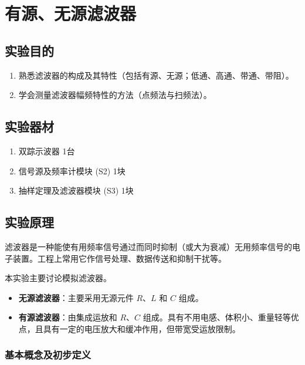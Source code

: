 \documentclass[12pt, a4paper]{ctexrep}
\begin{document}
\chapter{有源、无源滤波器}


\section{实验目的}

\begin{enumerate}
    \item 熟悉滤波器的构成及其特性（包括有源、无源；低通、高通、带通、带阻）。
    \item 学会测量滤波器幅频特性的方法（点频法与扫频法）。
\end{enumerate}

\section{实验器材}

\begin{enumerate}
    \item 双踪示波器 \quad 1台
    \item 信号源及频率计模块 (S2) \quad 1块
    \item 抽样定理及滤波器模块 (S3) \quad 1块
\end{enumerate}

\section{实验原理}

滤波器是一种能使有用频率信号通过而同时抑制（或大为衰减）无用频率信号的电子装置。工程上常用它作信号处理、数据传送和抑制干扰等。

本实验主要讨论模拟滤波器。
\begin{itemize}
    \item \textbf{无源滤波器}：主要采用无源元件 $R$、$L$ 和 $C$ 组成。
    \item \textbf{有源滤波器}：由集成运放和 $R$、$C$ 组成。具有不用电感、体积小、重量轻等优点，且具有一定的电压放大和缓冲作用，但带宽受运放限制。
\end{itemize}

\subsection{基本概念及初步定义}
\end{document}
